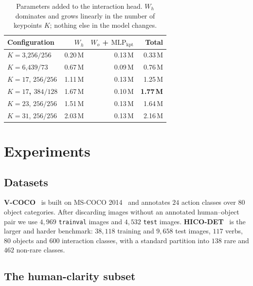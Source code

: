 \documentclass[12pt,a4paper]{article}
\begin{document}
\begin{table}[t]
\centering\small
\caption{Parameters added to the interaction head. $W_h$ dominates and grows
linearly in the number of keypoints $K$; nothing else in the model changes.}
\label{tab:params}
\setlength{\tabcolsep}{4.5pt}
\begin{tabular}{lrrr}
\toprule
Configuration & $W_h$ & $W_o$ + $\mathrm{MLP}_{\text{kpt}}$ & Total \\
\midrule
$K{=}3$,\quad $256/256$  & \phantom{0}0.20\,M & 0.13\,M & 0.33\,M \\
$K{=}6$,\quad $439/73$   & \phantom{0}0.67\,M & 0.09\,M & 0.76\,M \\
$K{=}17$, $256/256$   & \phantom{0}1.11\,M & 0.13\,M & 1.25\,M \\
\textbf{$K{=}17$, $384/128$} & \phantom{0}1.67\,M & 0.10\,M & \textbf{1.77\,M} \\
$K{=}23$, $256/256$   & \phantom{0}1.51\,M & 0.13\,M & 1.64\,M \\
$K{=}31$, $256/256$   & \phantom{0}2.03\,M & 0.13\,M & 2.16\,M \\
\bottomrule
\end{tabular}
\end{table}

\section{Experiments}
\label{sec:setup}

\subsection{Datasets}
\textbf{V-COCO}~\cite{gupta2015vcoco} is built on MS-COCO
2014~\cite{lin2014coco} and annotates $24$ action classes over $80$ object
categories. After discarding images without an annotated human--object pair we
use $4{,}969$ \texttt{trainval} images and $4{,}532$ \texttt{test} images.
\textbf{HICO-DET}~\cite{chao2018hicodet} is the larger and harder benchmark:
$38{,}118$ training and $9{,}658$ test images, $117$ verbs, $80$ objects and
$600$ interaction classes, with a standard partition into $138$ rare and $462$
non-rare classes.

\subsection{The human-clarity subset}
\label{sec:filtering}
\end{document}
